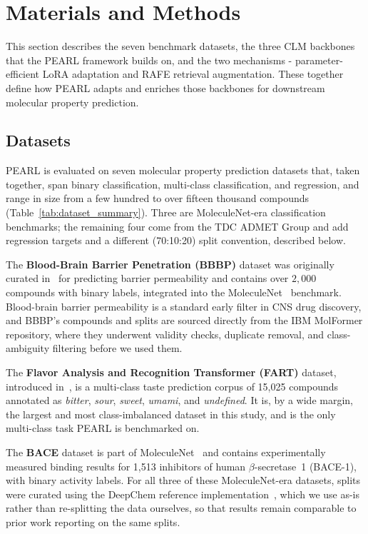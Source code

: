 \documentclass[pdflatex,sn-mathphys-num]{sn-jnl}%
\begin{document}
\section{Materials and Methods}\label{sec:pearl_arch}
This section describes the seven benchmark datasets, the three CLM backbones that the PEARL framework builds on, and the two mechanisms - parameter-efficient LoRA adaptation and RAFE retrieval augmentation. These together define how PEARL adapts and enriches those backbones for downstream molecular property prediction.

\subsection{Datasets}\label{sec:datasets}
PEARL is evaluated on seven molecular property prediction datasets that, taken together, span binary classification, multi-class classification, and regression, and range in size from a few hundred to over fifteen thousand compounds (Table~\ref{tab:dataset_summary}). Three are MoleculeNet-era classification benchmarks; the remaining four come from the TDC ADMET Group and add regression targets and a different (70:10:20) split convention, described below.

The \textbf{Blood-Brain Barrier Penetration (BBBP)} dataset was originally curated in~\cite{martins2012bayesian} for predicting barrier permeability and contains over $2,000$ compounds with binary labels, integrated into the MoleculeNet~\cite{wu2018moleculenet} benchmark. Blood-brain barrier permeability is a standard early filter in CNS drug discovery, and BBBP's compounds and splits are sourced directly from the IBM MolFormer repository, where they underwent validity checks, duplicate removal, and class-ambiguity filtering before we used them.

The \textbf{Flavor Analysis and Recognition Transformer (FART)} dataset, introduced in~\cite{zimmermann2024fart}, is a multi-class taste prediction corpus of 15,025 compounds annotated as \textit{bitter}, \textit{sour}, \textit{sweet}, \textit{umami}, and \textit{undefined}. It is, by a wide margin, the largest and most class-imbalanced dataset in this study, and is the only multi-class task PEARL is benchmarked on.

The \textbf{BACE} dataset is part of MoleculeNet~\cite{wu2018moleculenet} and contains experimentally measured binding results for 1,513 inhibitors of human $\beta$-secretase~1 (BACE-1), with binary activity labels. For all three of these MoleculeNet-era datasets, splits were curated using the DeepChem reference implementation~\cite{ramsundar2019deep}, which we use as-is rather than re-splitting the data ourselves, so that results remain comparable to prior work reporting on the same splits.
\end{document}
